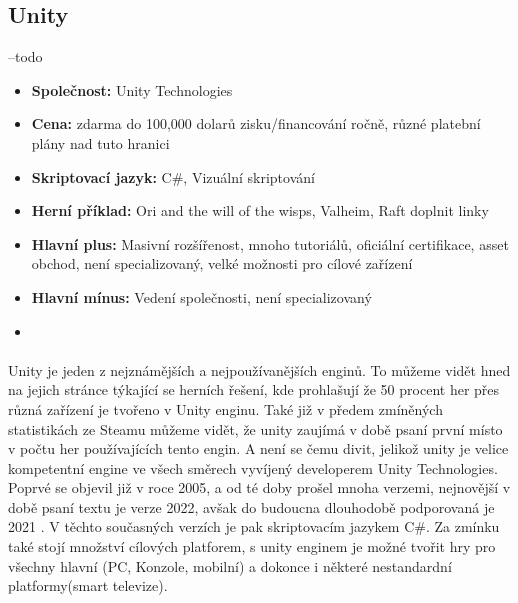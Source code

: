 \subsection{Unity}
	--todo \linebreak
	\begin{itemize}
		\item \textbf{Společnost: } Unity Technologies
		\item \textbf{Cena: } zdarma do 100,000 dolarů zisku/financování ročně, různé platební plány nad tuto hranici\cite{unity_pay_plan}
		\item \textbf{Skriptovací jazyk: } C\#, Vizuální skriptování
		\item \textbf{Herní příklad: } Ori and the will of the wisps, Valheim, Raft \todo doplnit linky
		\item \textbf{Hlavní plus: } Masivní rozšířenost, mnoho tutoriálů, oficiální certifikace, asset obchod, není specializovaný, velké možnosti pro cílové zařízení
		\item \textbf{Hlavní mínus: } Vedení společnosti, není specializovaný
		\item
	\end{itemize}

\paragraph{}
	Unity\cite{unity_engine} je jeden z nejznámějších a nejpoužívanějších enginů.
	To můžeme vidět hned na jejich stránce týkající se herních řešení, kde prohlašují že 50 procent her přes různá zařízení je tvořeno v Unity enginu.
	Také již v předem zmíněných statistikách ze Steamu\cite{steamdb_engines} můžeme vidět, že unity zaujímá v době psaní první místo v počtu her používajících tento engin.
	A není se čemu divit, jelikož unity je velice kompetentní engine ve všech směrech vyvíjený developerem Unity Technologies.
	Poprvé se objevil již v roce 2005, a od té doby prošel mnoha verzemi,  nejnovější v době psaní textu je verze 2022, avšak do budoucna dlouhodobě podporovaná je 2021 .
	V těchto současných verzích je pak skriptovacím jazykem C\#.
	Za zmínku také stojí množství cílových platforem, s unity enginem je možné tvořit hry pro všechny hlavní (PC, Konzole, mobilní) a dokonce i některé nestandardní platformy(smart televize).

